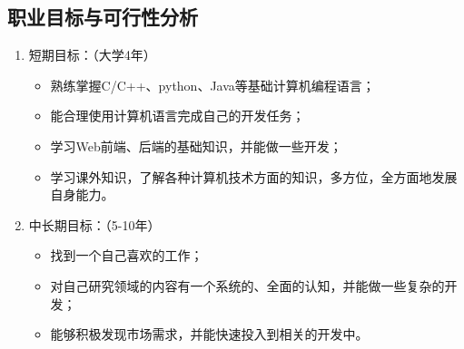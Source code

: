 \documentclass{article}
\begin{document}
\subsection{职业目标与可行性分析}
\par
\begin{enumerate}[1.]
	\item 短期目标：（大学4年）
\begin{itemize}
    \item 熟练掌握C/C++、python、Java等基础计算机编程语言；
    \item 能合理使用计算机语言完成自己的开发任务；
    \item 学习Web前端、后端的基础知识，并能做一些开发；
    \item 学习课外知识，了解各种计算机技术方面的知识，多方位，全方面地发展自身能力。
\end{itemize}
	\item 中长期目标：（5-10年）
\begin{itemize}
    \item 找到一个自己喜欢的工作；
    \item 对自己研究领域的内容有一个系统的、全面的认知，并能做一些复杂的开发；
    \item 能够积极发现市场需求，并能快速投入到相关的开发中。
\end{itemize}



\end{enumerate}
\end{document}
